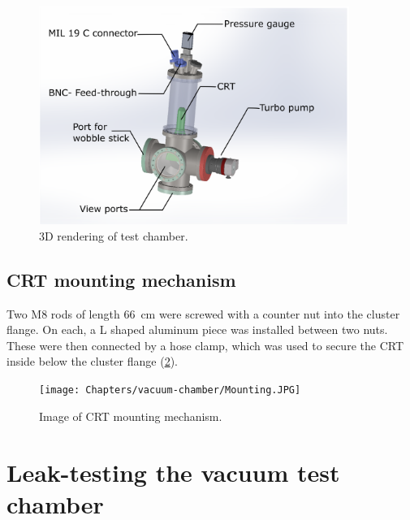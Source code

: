 \begin{figure}[ht]
	\centering
 	
	\includegraphics[width=0.9\textwidth]{./Chapters/vacuum-chamber/vacuum-chamber-annotated} %
	
	\caption{3D rendering of test chamber.}
	\label{fig:3D rendering of test chamber}
\end{figure}
 
\subsection{CRT mounting mechanism}
\label{subsec:CRT mounting mechanism}

Two M8 rods of length \SI{66}{\centi\meter} were screwed with a counter nut into the cluster flange. On each, a L shaped aluminum piece was installed between two nuts. These were then connected by a hose clamp, which was used to secure the CRT inside below the cluster flange (\cref{fig:Image of CRT mounting mechanism}).
 

\begin{figure}[ht]
	\centering
	
	\texttt{[image: Chapters/vacuum-chamber/Mounting.JPG]}
	
	\caption{Image of CRT mounting mechanism.}
	\label{fig:Image of CRT mounting mechanism}
\end{figure}


\section{Leak-testing the vacuum test chamber}
\label{sec:Leak-testing the vacuum test chamber}


